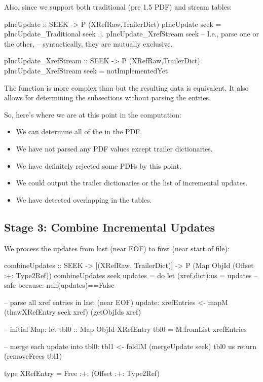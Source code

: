 Also, since we support both traditional (pre 1.5 PDF) and stream
\xref{} tables:

\begin{code}
pIncUpdate :: SEEK -> P (XRefRaw,TrailerDict)
pIncUpdate seek =
      pIncUpdate_Traditional seek
  .|. pIncUpdate_XrefStream seek
      -- I.e., parse one or the other,
      -- syntactically, they are mutually exclusive.

pIncUpdate_XrefStream :: SEEK -> P (XRefRaw,TrailerDict)
pIncUpdate_XrefStream seek = notImplementedYet
\end{code}

The function  is more
complex than  but the resulting
data is equivalent.  It also allows for determining the subsections
without parsing the \xref{} entries.

So, here's where we are at this point in the computation:
\begin{itemize}
\item We can determine all of the \objids in the PDF.
\item We have not parsed any PDF values except trailer dictionaries.
\item We have definitely rejected some PDFs by this point.
\item We could output the trailer dictionaries or the list of
  incremental updates.
\item We have detected overlapping \objids in the \xref tables.
\end{itemize}


\subsection{Stage 3: Combine Incremental Updates}

We process the updates from last (near EOF) to first (near start of file):
\begin{code}
combineUpdates :: SEEK
               -> [(XRefRaw, TrailerDict)] 
               -> P (Map ObjId (Offset :+: Type2Ref))
combineUpdates seek updates =
    do
    let (xref,dict):us = updates -- safe because: null(updates)==False

    -- parse all xref entries in last (near EOF) update:
    xrefEntries <- mapM (thawXRefEntry seek xref) (getObjIds xref)

    -- initial Map:
    let tbl0 :: Map ObjId XRefEntry
        tbl0 = M.fromList xrefEntries

    -- merge each update into tbl0:
    tbl1  <- foldlM (mergeUpdate seek) tbl0 us
    return (removeFrees tbl1)

type XRefEntry = Free :+: (Offset :+: Type2Ref)
\end{code}

